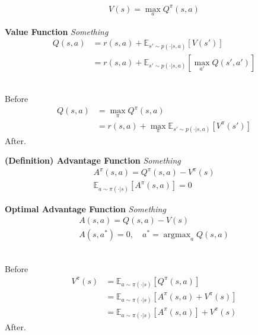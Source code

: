 \begin{align*}
    V(s) = \max_{a}Q^{\pi}(s,a)
\end{align*}




\begin{tcolorbox}
\textbf{
    Value Function
} 
\textit{
    Something
}
\begin{align*}
    Q(s,a) & = r(s,a) + \mathbb{E}_{s' \sim p(\cdot|s,a)}[V(s')] \\
    & = r(s,a) + \mathbb{E}_{s' \sim p(\cdot|s,a)}[\max_{a'}Q(s',a')]
\end{align*}
\end{tcolorbox}

\begin{solution}\ \\
Before
\begin{align*}
    Q(s,a) & = \max_{\pi}Q^{\pi}(s,a) \\
    & = r(s,a) + \max_{\pi}\mathbb{E}_{s' \sim p(\cdot|s,a)}[V^{\pi}(s')]
\end{align*}
After.
\end{solution}





\begin{tcolorbox}
\textbf{
    (Definition) Advantage Function
} 
\textit{
    Something
}
\begin{align*}
    A^{\pi}(s,a) = Q^{\pi}(s,a) - V^{\pi}(s) \\
    \mathbb{E}_{a \sim \pi(\cdot|s)}[A^{\pi}(s,a)] = 0
\end{align*}
\end{tcolorbox}





\begin{tcolorbox}
\textbf{
    Optimal Advantage Function
} 
\textit{
    Something
}
\begin{align*}
    A(s,a) = Q(s,a) - V(s) \\
    A(s,a^{*}) = 0, \quad a^{*} = \mathop{\arg\max}_{a}Q(s,a)
\end{align*}
\end{tcolorbox}

\begin{solution}\ \\
Before
\begin{align*}
    V^{\pi}(s) & = \mathbb{E}_{a \sim \pi(\cdot|s)}[Q^{\pi}(s,a)] \\
    & = \mathbb{E}_{a \sim \pi(\cdot|s)}[A^{\pi}(s,a) + V^{\pi}(s)] \\
    & = \mathbb{E}_{a \sim \pi(\cdot|s)}[A^{\pi}(s,a)] + V^{\pi}(s)
\end{align*}
After.
\end{solution}












